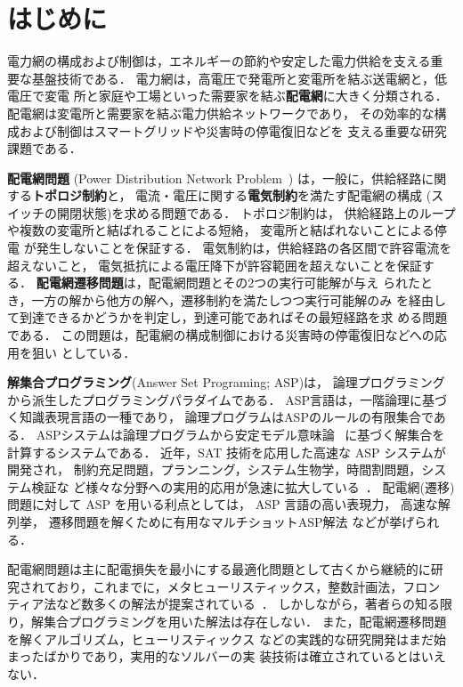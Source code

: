 \section{はじめに}\label{chap:intro}

電力網の構成および制御は，エネルギーの節約や安定した電力供給を支える重
要な基盤技術である．
電力網は，高電圧で発電所と変電所を結ぶ送電網と，低電圧で変電
所と家庭や工場といった需要家を結ぶ\textbf{配電網}に大きく分類される．
配電網は変電所と需要家を結ぶ電力供給ネットワークであり，
その効率的な構成および制御はスマートグリッドや災害時の停電復旧などを
支える重要な研究課題である．

\textbf{配電網問題}
(Power Distribution Network Problem~\cite{Minato:dnet:ZDD,DBLP:journals/tsg/InoueTWKYKTMH14})
は，一般に，供給経路に関する\textbf{トポロジ制約}と，
電流・電圧に関する\textbf{電気制約}を満たす配電網の構成
(スイッチの開閉状態)を求める問題である．
トポロジ制約は，
供給経路上のループや複数の変電所と結ばれることによる短絡，
変電所と結ばれないことによる停電
が発生しないことを保証する．
電気制約は，供給経路の各区間で許容電流を超えないこと，
電気抵抗による電圧降下が許容範囲を超えないことを保証する．
%
\textbf{配電網遷移問題}は，配電網問題とその2つの実行可能解が与え
られたとき，一方の解から他方の解へ，遷移制約を満たしつつ実行可能解のみ
を経由して到達できるかどうかを判定し，到達可能であればその最短経路を求
める問題である．
この問題は，配電網の構成制御における災害時の停電復旧などへの応用を狙い
としている．

\textbf{解集合プログラミング}(Answer Set Programing; ASP\cite{%
  Baral03:cambridge,%
  Gelfond88:iclp,%
  Inoue08:jssst,%
  Niemela99:amai})は，
論理プログラミングから派生したプログラミングパラダイムである．
ASP言語は，一階論理に基づく知識表現言語の一種であり，
論理プログラムはASPのルールの有限集合である．
ASPシステムは論理プログラムから安定モデル意味論~\cite{Gelfond88:iclp}
に基づく解集合を計算するシステムである．
近年，SAT 技術を応用した高速な ASP システムが開発され，
制約充足問題，プランニング，システム生物学，時間割問題，システム検証な
ど様々な分野への実用的応用が急速に拡大している~\cite{%
  DBLP:journals/anor/BanbaraIKOSSTW19,%
  DBLP:journals/tplp/BanbaraKOS17,%
  ASPAISAT}．
配電網(遷移)問題に対して ASP を用いる利点としては，
ASP 言語の高い表現力，
高速な解列挙，
遷移問題を解くために有用なマルチショットASP解法
などが挙げられる．

配電網問題は主に配電損失を最小にする最適化問題として古くから継続的に研
究されており，これまでに，メタヒューリスティックス，整数計画法，フロン
ティア法など数多くの解法が提案されている~\cite{%
  ChiJum90,
  Hayashi:dnet:model,
  Minato:dnet:ZDD,
  DBLP:journals/tsg/InoueTWKYKTMH14}．
しかしながら，著者らの知る限り，解集合プログラミングを用いた解法は存在しない．
また，配電網遷移問題を解くアルゴリズム，ヒューリスティックス
などの実践的な研究開発はまだ始まったばかりであり，実用的なソルバーの実
装技術は確立されているとはいえない．

